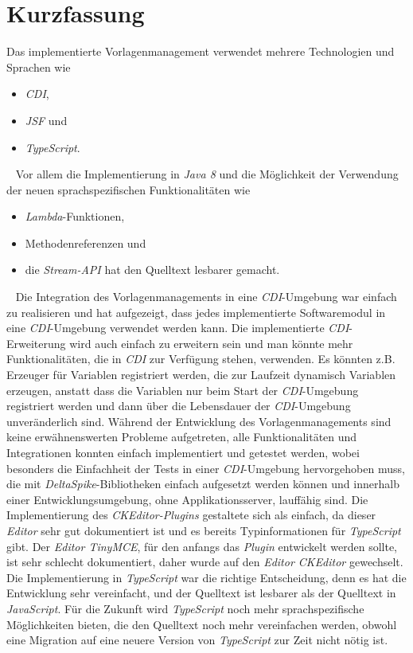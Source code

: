 \chapter{Kurzfassung}
Das implementierte Vorlagenmanagement verwendet mehrere Technologien und Sprachen wie
\begin{itemize}
	\item\emph{CDI},
	\item\emph{JSF} und
	\item\emph{TypeScript}.
\end{itemize}
\ \newline
Vor allem die Implementierung in \emph{Java 8} und die Möglichkeit der Verwendung der neuen sprachspezifischen Funktionalitäten wie
\begin{itemize}
	\item\emph{Lambda}-Funktionen,
	\item Methodenreferenzen und
	\item die \emph{Stream-API} hat den Quelltext lesbarer gemacht.
\end{itemize}
\ \newline
Die Integration des Vorlagenmanagements in eine \emph{CDI}-Umgebung war einfach zu realisieren und hat aufgezeigt, dass jedes implementierte Softwaremodul in eine \emph{CDI}-Umgebung verwendet werden kann. Die implementierte \emph{CDI}-Erweiterung wird auch einfach zu erweitern sein und man könnte mehr Funktionalitäten, die in  \emph{CDI} zur Verfügung stehen, verwenden. Es könnten z.B. Erzeuger für Variablen registriert werden, die zur Laufzeit dynamisch Variablen erzeugen, anstatt dass die Variablen nur beim Start der \emph{CDI}-Umgebung registriert werden und dann über die Lebensdauer der \emph{CDI}-Umgebung  unveränderlich sind. 
\newline
\newline
Während der Entwicklung des Vorlagenmanagements sind keine erwähnenswerten Probleme aufgetreten, alle Funktionalitäten und Integrationen konnten einfach implementiert und getestet werden, wobei besonders die Einfachheit der Tests in einer \emph{CDI}-Umgebung hervorgehoben muss, die mit \emph{DeltaSpike}-Bibliotheken einfach aufgesetzt werden können und innerhalb einer Entwicklungsumgebung, ohne Applikationsserver, lauffähig sind.
\newline
\newline
Die Implementierung des \emph{CKEditor-Plugins} gestaltete sich als einfach, da dieser \emph{Editor} sehr gut dokumentiert ist und es bereits Typinformationen für \emph{TypeScript} gibt. Der \emph{Editor TinyMCE}, für den anfangs das \emph{Plugin} entwickelt werden sollte, ist sehr schlecht dokumentiert, daher wurde auf den \emph{Editor CKEditor} gewechselt. Die Implementierung in \emph{TypeScript} war die richtige Entscheidung, denn es hat die Entwicklung sehr vereinfacht, und der Quelltext ist lesbarer als der Quelltext in \emph{JavaScript}. Für die Zukunft wird \emph{TypeScript} noch mehr sprachspezifische Möglichkeiten bieten, die den Quelltext noch mehr vereinfachen werden, obwohl eine Migration auf eine neuere Version von \emph{TypeScript} zur Zeit nicht nötig ist.